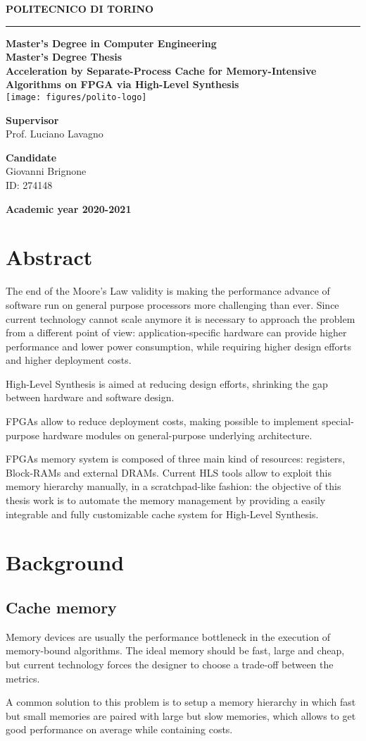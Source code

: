 \documentclass[11pt,a4paper]{memoir}
\renewcommand*{\maketitle}%
{
	\newgeometry{left=2cm,right=2cm,top=3cm,bottom=3.5cm}

	\begin{center}
		\begingroup
		{\Huge\textbf{POLITECNICO DI TORINO}}\\[\baselineskip]
		\rule{\textwidth}{2pt}\par
		\vspace*{1em}
		{\LARGE\textbf{Master's Degree in Computer Engineering}}\\[\baselineskip]
		\vspace*{1em}
		{\Large\textbf{Master's Degree Thesis}}\\
		\vspace*{2cm}
		{\huge\textbf{Acceleration by Separate-Process Cache for
		Memory-Intensive Algorithms on FPGA via High-Level Synthesis}}\\
		\vspace*{1cm}
		\texttt{[image: figures/polito-logo]}
	\end{center}
	\vfill
	\begin{minipage}{0.4\textwidth}
		\begin{flushleft}
			{\Large
				\textbf{Supervisor}\\
				Prof. Luciano Lavagno
			}
		\end{flushleft}
	\end{minipage}
	\begin{minipage}{0.4\textwidth}
		\begin{flushright} 
			{\Large
				\textbf{Candidate}\\
				Giovanni Brignone\\
				ID: 274148
			}
		\end{flushright}
	\end{minipage}  
	\vspace*{2cm}
	\begin{center}
		{\Large\textbf{Academic year 2020-2021}}
	\end{center}
	\endgroup

	\restoregeometry 
}
\begin{document}
\pagestyle{empty}
\maketitle

\frontmatter
\chapter*{Abstract}
The end of the Moore's Law validity is making the performance advance of
software run on general purpose processors more challenging than ever.
Since current technology cannot scale anymore it is necessary to approach the
problem from a different point of view: application-specific hardware can
provide higher performance and lower power consumption, while requiring higher
design efforts and higher deployment costs.

High-Level Synthesis is aimed at reducing design efforts, shrinking the gap
between hardware and software design.

FPGAs allow to reduce deployment costs, making possible to implement
special-purpose hardware modules on general-purpose underlying architecture.

FPGAs memory system is composed of three main kind of resources: registers,
Block-RAMs and external DRAMs.
Current HLS tools allow to exploit this memory hierarchy manually, in a
scratchpad-like fashion: the objective of this thesis work is to automate the
memory management by providing a easily integrable and fully customizable cache
system for High-Level Synthesis.

\pagebreak
\tableofcontents*

\mainmatter
\chapter{Background}
\section{Cache memory}
Memory devices are usually the performance bottleneck in the execution of
memory-bound algorithms.
The ideal memory should be fast, large and cheap, but current technology forces
the designer to choose a trade-off between the metrics.

A common solution to this problem is to setup a memory hierarchy in
which fast but small memories are paired with large but slow memories, which
allows to get good performance on average while containing costs.
\end{document}
